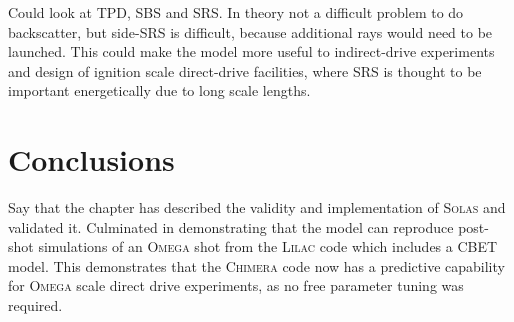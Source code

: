 Could look at TPD, SBS and SRS.
In theory not a difficult problem to do backscatter, but side-SRS is difficult, because additional rays would need to be launched.
This could make the model more useful to indirect-drive experiments and design of ignition scale direct-drive facilities, where SRS is thought to be important energetically due to long scale lengths.



\section{Conclusions}

Say that the chapter has described the validity and implementation of \textsc{Solas} and validated it.
Culminated in demonstrating that the model can reproduce post-shot simulations of an \textsc{Omega} shot from the \textsc{Lilac} code which includes a CBET model.
This demonstrates that the \textsc{Chimera} code now has a predictive capability for \textsc{Omega} scale direct drive experiments, as no free parameter tuning was required.
